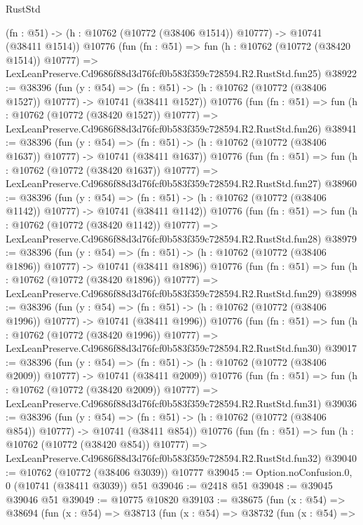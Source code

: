 \begin{lexlean}{RustStd}
\begin{coremodule}
    (fn : @51) -> (h : @10762 (@10772 (@38406 @1514)) @10777) -> @10741 (@38411 @1514))
    @10776
    (fun (fn : @51) =>
    fun (h : @10762 (@10772 (@38420 @1514)) @10777) =>
    LexLeanPreserve.Cd9686f88d3d76fcf0b583f359c728594.R2.RustStd.fun25)
@38922 := @38396
    (fun (y : @54) =>
    (fn : @51) -> (h : @10762 (@10772 (@38406 @1527)) @10777) -> @10741 (@38411 @1527))
    @10776
    (fun (fn : @51) =>
    fun (h : @10762 (@10772 (@38420 @1527)) @10777) =>
    LexLeanPreserve.Cd9686f88d3d76fcf0b583f359c728594.R2.RustStd.fun26)
@38941 := @38396
    (fun (y : @54) =>
    (fn : @51) -> (h : @10762 (@10772 (@38406 @1637)) @10777) -> @10741 (@38411 @1637))
    @10776
    (fun (fn : @51) =>
    fun (h : @10762 (@10772 (@38420 @1637)) @10777) =>
    LexLeanPreserve.Cd9686f88d3d76fcf0b583f359c728594.R2.RustStd.fun27)
@38960 := @38396
    (fun (y : @54) =>
    (fn : @51) -> (h : @10762 (@10772 (@38406 @1142)) @10777) -> @10741 (@38411 @1142))
    @10776
    (fun (fn : @51) =>
    fun (h : @10762 (@10772 (@38420 @1142)) @10777) =>
    LexLeanPreserve.Cd9686f88d3d76fcf0b583f359c728594.R2.RustStd.fun28)
@38979 := @38396
    (fun (y : @54) =>
    (fn : @51) -> (h : @10762 (@10772 (@38406 @1896)) @10777) -> @10741 (@38411 @1896))
    @10776
    (fun (fn : @51) =>
    fun (h : @10762 (@10772 (@38420 @1896)) @10777) =>
    LexLeanPreserve.Cd9686f88d3d76fcf0b583f359c728594.R2.RustStd.fun29)
@38998 := @38396
    (fun (y : @54) =>
    (fn : @51) -> (h : @10762 (@10772 (@38406 @1996)) @10777) -> @10741 (@38411 @1996))
    @10776
    (fun (fn : @51) =>
    fun (h : @10762 (@10772 (@38420 @1996)) @10777) =>
    LexLeanPreserve.Cd9686f88d3d76fcf0b583f359c728594.R2.RustStd.fun30)
@39017 := @38396
    (fun (y : @54) =>
    (fn : @51) -> (h : @10762 (@10772 (@38406 @2009)) @10777) -> @10741 (@38411 @2009))
    @10776
    (fun (fn : @51) =>
    fun (h : @10762 (@10772 (@38420 @2009)) @10777) =>
    LexLeanPreserve.Cd9686f88d3d76fcf0b583f359c728594.R2.RustStd.fun31)
@39036 := @38396
    (fun (y : @54) =>
    (fn : @51) -> (h : @10762 (@10772 (@38406 @854)) @10777) -> @10741 (@38411 @854))
    @10776
    (fun (fn : @51) =>
    fun (h : @10762 (@10772 (@38420 @854)) @10777) =>
    LexLeanPreserve.Cd9686f88d3d76fcf0b583f359c728594.R2.RustStd.fun32)
@39040 := @10762 (@10772 (@38406 @3039)) @10777
@39045 := Option.noConfusion.{0, 0} (@10741 (@38411 @3039)) @51
@39046 := @2418 @51
@39048 := @39045 @39046 @51
@39049 := @10775 @10820
@39103 := @38675
    (fun (x : @54) =>
    @38694
      (fun (x : @54) =>
      @38713
        (fun (x : @54) =>
        @38732
          (fun (x : @54) =>

\end{coremodule}
\end{lexlean}
